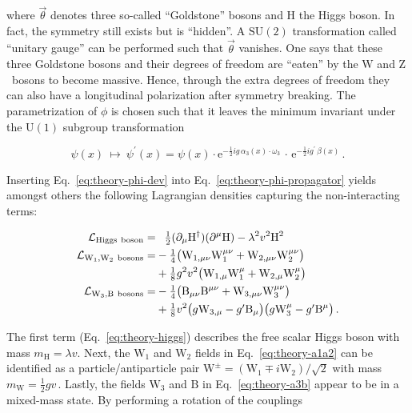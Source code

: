 where $\vec{\theta}$ denotes three so-called ``Goldstone'' bosons and $\mathrm{H}$ the Higgs boson. In fact, the symmetry still exists but is ``hidden''. A $\mathrm{SU(2)}$ transformation called ``unitary gauge'' can be performed such that $\vec{\theta}$ vanishes. One says that these three Goldstone bosons and their degrees of freedom are ``eaten'' by the $\mathrm{W}$ and $\mathrm{Z}$~bosons to become massive. Hence, through the extra degrees of freedom they can also have a longitudinal polarization after symmetry breaking. The parametrization of $\phi$ is chosen such that it leaves the minimum invariant under the $\mathrm{U(1)}$ subgroup transformation

\begin{equation}
\psi(x)~\mapsto~\psi^\prime(x)=\psi(x)\cdot\mathrm{e}^{-\tfrac{1}{2}ig\,\alpha_{3}(x)\cdot\omega_{3}}\,\cdot\,\mathrm{e}^{-\tfrac{1}{2}ig^{\prime}\,\beta(x)}\,. \label{eq:theory-broken-u1-trans}
\end{equation}

Inserting Eq.~\ref{eq:theory-phi-dev} into Eq.~\ref{eq:theory-phi-propagator} yields amongst others the following Lagrangian densities capturing the non-interacting terms:

\begin{subequations}
\begin{align}
\mathcal{L}_\mathrm{Higgs~boson}=&\hphantom{-}\tfrac{1}{2}(\partial_{\mu}\mathrm{H}^{\dagger})(\partial^{\mu}\mathrm{H})-\lambda^2 v^2 \mathrm{H}^2 \label{eq:theory-higgs} \\
\mathcal{L}_\mathrm{W_1,W_2~bosons}=&-\tfrac{1}{4}\big(\mathrm{W}_{1,\mu\nu}\mathrm{W}^{\mu\nu}_{1}+\mathrm{W}_{2,\mu\nu}\mathrm{W}^{\mu\nu}_{2}\big)\nonumber\\&+\tfrac{1}{8}g^2 v^2 \big(\mathrm{W}_{1,\mu} \mathrm{W}_{1}^{\mu}+\mathrm{W}_{2,\mu} \mathrm{W}_{2}^{\mu}\big) \label{eq:theory-a1a2} \\
\mathcal{L}_\mathrm{W_3,B~bosons}=&-\tfrac{1}{4}\big(\mathrm{B}_{\mu\nu}\mathrm{B}^{\mu\nu}+\mathrm{W}_{3,\mu\nu}\mathrm{W}^{\mu\nu}_{3}\big)\nonumber\\
&+\tfrac{1}{8}v^2 \big(g\mathrm{W}_{3,\mu}-g^{\prime}\mathrm{B}_\mu\big)\big(g\mathrm{W}_{3}^{\mu}-g^{\prime}\mathrm{B}^\mu\big)\,. \label{eq:theory-a3b}
\end{align}
\end{subequations}

The first term (Eq.~\ref{eq:theory-higgs}) describes the free scalar Higgs boson with mass $m_\mathrm{H}=\lambda v$. Next, the $\mathrm{W}_{1}$ and $\mathrm{W}_{2}$
fields in Eq.~\ref{eq:theory-a1a2} can be identified as a particle/antiparticle pair $\mathrm{W}^{\pm}=(\mathrm{W}_1\mp i\mathrm{W}_2)/\sqrt{2}$ with mass $m_\mathrm{W}=\frac{1}{2}gv$\,. Lastly, the fields $\mathrm{W}_3$ and $\mathrm{B}$ in Eq.~\ref{eq:theory-a3b} appear to be in a mixed-mass state. By performing a rotation of the couplings

